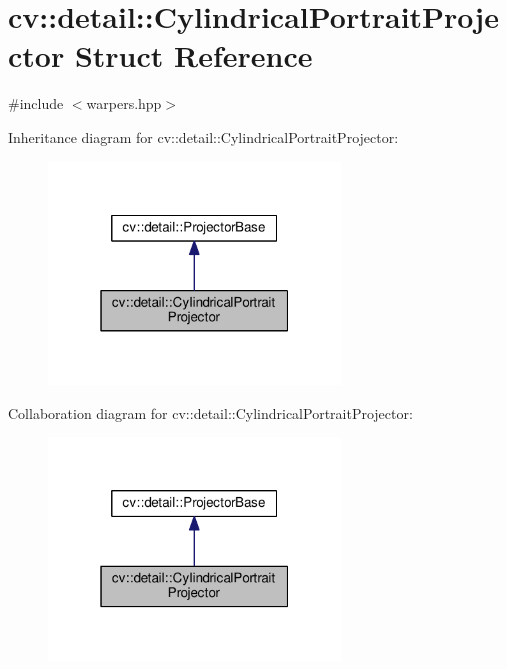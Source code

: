\hypertarget{structcv_1_1detail_1_1CylindricalPortraitProjector}{\section{cv\-:\-:detail\-:\-:Cylindrical\-Portrait\-Projector Struct Reference}
\label{structcv_1_1detail_1_1CylindricalPortraitProjector}
}


{\ttfamily \#include $<$warpers.\-hpp$>$}



Inheritance diagram for cv\-:\-:detail\-:\-:Cylindrical\-Portrait\-Projector\-:\nopagebreak
\begin{figure}[H]
\begin{center}
\leavevmode
\includegraphics[width=220pt]{structcv_1_1detail_1_1CylindricalPortraitProjector__inherit__graph}
\end{center}
\end{figure}


Collaboration diagram for cv\-:\-:detail\-:\-:Cylindrical\-Portrait\-Projector\-:\nopagebreak
\begin{figure}[H]
\begin{center}
\leavevmode
\includegraphics[width=220pt]{structcv_1_1detail_1_1CylindricalPortraitProjector__coll__graph}
\end{center}
\end{figure}
